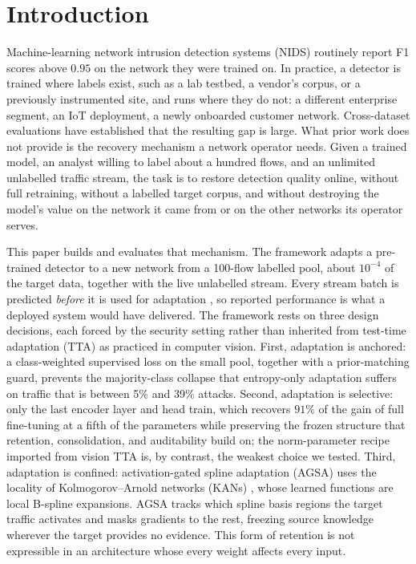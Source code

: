 \documentclass[10pt, conference, letterpaper]{IEEEtran}
\begin{document}
\section{Introduction}\label{sec:intro}
Machine-learning network intrusion detection systems (NIDS) routinely
report F1 scores above $0.95$ on the network they were trained on. In practice, a detector is trained where
labels exist, such as a lab testbed, a vendor's corpus, or a previously
instrumented site, and runs where they do not: a different enterprise
segment, an IoT deployment, a newly onboarded customer network.
Cross-dataset evaluations
\cite{apruzzese2022cross,layeghy2023generalisability} have established
that the resulting gap is large. What prior work does not provide is
the recovery mechanism a network operator needs. Given a trained model,
an analyst willing to label about a hundred flows, and an unlimited
unlabelled traffic stream, the task is to restore detection quality
online, without full retraining, without a labelled target corpus, and
without destroying the model's value on the network it came from or on
the other networks its operator serves.

This paper builds and evaluates that mechanism. The framework adapts a
pre-trained detector to a new network from a 100-flow labelled pool,
about $10^{-4}$ of the target data, together with the live unlabelled
stream. Every stream batch is predicted \emph{before} it is used for
adaptation \cite{wang2021tent}, so reported performance is what a
deployed system would have delivered. The framework rests on three
design decisions, each forced by the security setting rather than
inherited from test-time adaptation (TTA) as practiced in computer
vision. First, adaptation is anchored: a class-weighted supervised
loss on the small pool, together with a prior-matching guard, prevents
the majority-class collapse that entropy-only adaptation
\cite{wang2021tent} suffers on traffic that is between 5\% and 39\%
attacks. Second, adaptation is selective: only the last encoder layer
and head train, which recovers $91\%$ of the gain of full fine-tuning
at a fifth of the parameters while preserving the frozen structure that
retention, consolidation, and auditability build on; the
norm-parameter recipe imported from vision TTA is, by contrast, the
weakest choice we tested. Third, adaptation is confined:
activation-gated spline adaptation (AGSA) uses the locality of
Kolmogorov--Arnold networks (KANs) \cite{liu2024kan}, whose learned
functions are local B-spline expansions. AGSA tracks which spline
basis regions the target traffic activates and masks gradients to the
rest, freezing source knowledge wherever the target provides no
evidence. This form of retention is not expressible in an architecture
whose every weight affects every input.
\end{document}
